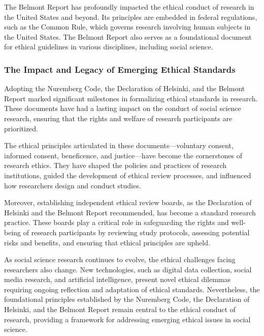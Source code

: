 \documentclass[
]{book}
\begin{document}
The Belmont Report has profoundly impacted the ethical conduct of research in the United States and beyond. Its principles are embedded in federal regulations, such as the Common Rule, which governs research involving human subjects in the United States. The Belmont Report also serves as a foundational document for ethical guidelines in various disciplines, including social science.

\subsubsection*{The Impact and Legacy of Emerging Ethical Standards}\label{the-impact-and-legacy-of-emerging-ethical-standards}

Adopting the Nuremberg Code, the Declaration of Helsinki, and the Belmont Report marked significant milestones in formalizing ethical standards in research. These documents have had a lasting impact on the conduct of social science research, ensuring that the rights and welfare of research participants are prioritized.

The ethical principles articulated in these documents---voluntary consent, informed consent, beneficence, and justice---have become the cornerstones of research ethics. They have shaped the policies and practices of research institutions, guided the development of ethical review processes, and influenced how researchers design and conduct studies.

Moreover, establishing independent ethical review boards, as the Declaration of Helsinki and the Belmont Report recommended, has become a standard research practice. These boards play a critical role in safeguarding the rights and well-being of research participants by reviewing study protocols, assessing potential risks and benefits, and ensuring that ethical principles are upheld.

As social science research continues to evolve, the ethical challenges facing researchers also change. New technologies, such as digital data collection, social media research, and artificial intelligence, present novel ethical dilemmas requiring ongoing reflection and adaptation of ethical standards. Nevertheless, the foundational principles established by the Nuremberg Code, the Declaration of Helsinki, and the Belmont Report remain central to the ethical conduct of research, providing a framework for addressing emerging ethical issues in social science.
\end{document}

